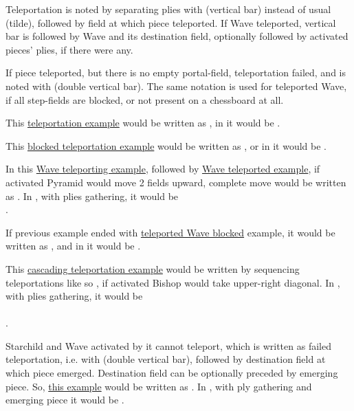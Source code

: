 Teleportation is noted by separating plies with \alg{|} (vertical bar) instead of usual \alg{\~{}} (tilde),
followed by field at which piece teleported. If Wave teleported, vertical bar is followed by Wave and its
destination field, optionally followed by activated pieces' plies, if there were any.

If piece teleported, but there is no empty portal-field, teleportation failed, and is noted with \alg{||}
(double vertical bar). The same notation is used for teleported Wave, if all step-fields are blocked, or
not present on a chessboard at all.

This \hyperref[fig:scn_n_02_teleport_init]{teleportation example} would be written as , in
 it would be .

This \hyperref[fig:scn_n_03_teleport_move_2]{blocked teleportation example} would be written as ,
or in  it would be .

In this \hyperref[fig:scn_n_04_teleport_move_3]{Wave teleporting example}, followed by
\hyperref[fig:scn_n_05_teleport_end]{Wave teleported example}, if activated Pyramid would move 2 fields upward,
complete move would be written as . In , with plies gathering, it would
be \\
\alg{[Gi11-g15]\~{}[Wg15-a18]|[Wr1-l4]\~{}[Al4-l6]}.

If previous example ended with \hyperref[fig:scn_n_06_teleport_wave_blocked]{teleported Wave blocked} example,
it would be written as , and in  it would be \alg{[Gi11-g15]\~{}[Wg15-a18]||}.

This \hyperref[fig:scn_d_13_teleporting_wave_cascade]{cascading teleportation example} would be written by
sequencing teleportations like so , if activated Bishop would take upper-right
diagonal. In , with plies gathering, it would be \\
\alg{[Gj6-h2]\~{}[Wh2-b4]|[Wm18-a24]|[Wx1-r4]\~{}}\\
\alg{[Br4-t6]}.

Starchild and Wave activated by it cannot teleport, which is written as failed teleportation, i.e. with \alg{||}
(double vertical bar), followed by destination field at which piece emerged. Destination field can be optionally
preceded by emerging piece. So,
\hyperref[fig:scn_o_10_starchild_not_moving_monolith_init]{this example} would be written as .
In , with ply gathering and emerging piece it would be .


